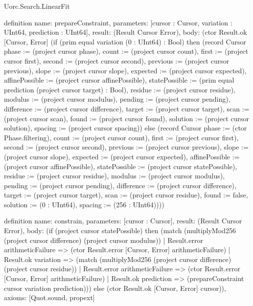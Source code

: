 \begin{lexlean}{Uorc.Search.LinearFit}
\begin{semanticmodule}
definition{
  name: prepareConstraint,
  parameters: [cursor : Cursor, variation : UInt64, prediction : UInt64],
  result: (Result Cursor Error),
  body: (ctor Result.ok [Cursor, Error] (if (prim equal variation (0 : UInt64) : Bool) then (record Cursor {phase := (project cursor phase), count := (project cursor count), first := (project cursor first), second := (project cursor second), previous := (project cursor previous), slope := (project cursor slope), expected := (project cursor expected), affinePossible := (project cursor affinePossible), statePossible := (prim equal prediction (project cursor target) : Bool), residue := (project cursor residue), modulus := (project cursor modulus), pending := (project cursor pending), difference := (project cursor difference), target := (project cursor target), scan := (project cursor scan), found := (project cursor found), solution := (project cursor solution), spacing := (project cursor spacing)}) else (record Cursor {phase := (ctor Phase.filtering), count := (project cursor count), first := (project cursor first), second := (project cursor second), previous := (project cursor previous), slope := (project cursor slope), expected := (project cursor expected), affinePossible := (project cursor affinePossible), statePossible := (project cursor statePossible), residue := (project cursor residue), modulus := (project cursor modulus), pending := (project cursor pending), difference := (project cursor difference), target := (project cursor target), scan := (project cursor residue), found := false, solution := (0 : UInt64), spacing := (256 : UInt64)})))
}

definition{
  name: constrain,
  parameters: [cursor : Cursor],
  result: (Result Cursor Error),
  body: (if (project cursor statePossible) then (match (multiplyMod256 (project cursor difference) (project cursor modulus))
    | Result.error arithmeticFailure => (ctor Result.error [Cursor, Error] arithmeticFailure)
    | Result.ok variation => (match (multiplyMod256 (project cursor difference) (project cursor residue))
      | Result.error arithmeticFailure => (ctor Result.error [Cursor, Error] arithmeticFailure)
      | Result.ok prediction => (prepareConstraint cursor variation prediction))) else (ctor Result.ok [Cursor, Error] cursor)),
  axioms: [Quot.sound, propext]
}


\end{semanticmodule}
\end{lexlean}
